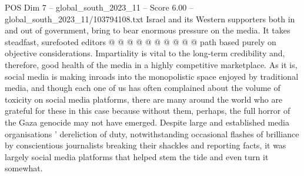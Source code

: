 \begin{textsample}{POS Dim 7 – global\_south\_2023\_11 – Score 6.00 – global\_south\_2023\_11/103794108.txt}
Israel and its Western supporters both in and out of government, bring to bear enormous pressure on the media.
It takes steadfast, surefooted editors @ @ @ @ @ @ @ @ @ @ path based purely on objective considerations.
Impartiality is vital to the long-term credibility and, therefore, good health of the media in a highly competitive marketplace.
As it is, social media is making inroads into the monopolistic space enjoyed by traditional media, and though each one of us has often complained about the volume of toxicity on social media platforms, there are many around the world who are grateful for these in this case because without them, perhaps, the full horror of the Gaza genocide may not have emerged.
Despite large and established media organisations ' dereliction of duty, notwithstanding occasional flashes of brilliance by conscientious journalists breaking their shackles and reporting facts, it was largely social media platforms that helped stem the tide and even turn it somewhat.

\end{textsample}
